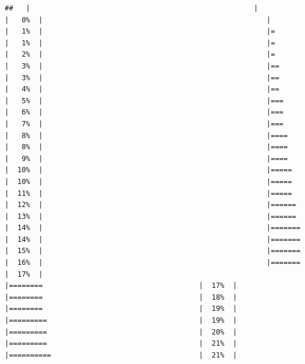 \documentclass[
  krantz2]{krantz}
\begin{document}
\begin{verbatim}
##   |                                                     |                                             |   0%  |                                                     |                                             |   1%  |                                                     |=                                            |   1%  |                                                     |=                                            |   2%  |                                                     |=                                            |   3%  |                                                     |==                                           |   3%  |                                                     |==                                           |   4%  |                                                     |==                                           |   5%  |                                                     |===                                          |   6%  |                                                     |===                                          |   7%  |                                                     |===                                          |   8%  |                                                     |====                                         |   8%  |                                                     |====                                         |   9%  |                                                     |====                                         |  10%  |                                                     |=====                                        |  10%  |                                                     |=====                                        |  11%  |                                                     |=====                                        |  12%  |                                                     |======                                       |  13%  |                                                     |======                                       |  14%  |                                                     |=======                                      |  14%  |                                                     |=======                                      |  15%  |                                                     |=======                                      |  16%  |                                                     |=======                                      |  17%  |                                                     |========                                     |  17%  |                                                     |========                                     |  18%  |                                                     |========                                     |  19%  |                                                     |=========                                    |  19%  |                                                     |=========                                    |  20%  |                                                     |=========                                    |  21%  |                                                     |==========                                   |  21%  |         
\end{verbatim}
\end{document}
